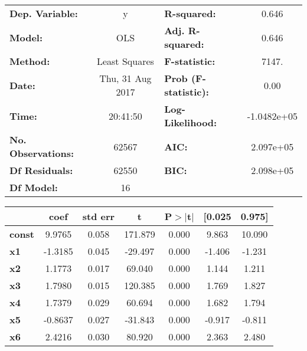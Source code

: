 \documentclass{article}
\begin{document}
\begin{center}
\begin{tabular}{lclc}
\toprule
\textbf{Dep. Variable:}    &        y         & \textbf{  R-squared:         } &      0.646   \\
\textbf{Model:}            &       OLS        & \textbf{  Adj. R-squared:    } &      0.646   \\
\textbf{Method:}           &  Least Squares   & \textbf{  F-statistic:       } &      7147.   \\
\textbf{Date:}             & Thu, 31 Aug 2017 & \textbf{  Prob (F-statistic):} &      0.00    \\
\textbf{Time:}             &     20:41:50     & \textbf{  Log-Likelihood:    } & -1.0482e+05  \\
\textbf{No. Observations:} &       62567      & \textbf{  AIC:               } &  2.097e+05   \\
\textbf{Df Residuals:}     &       62550      & \textbf{  BIC:               } &  2.098e+05   \\
\textbf{Df Model:}         &          16      & \textbf{                     } &              \\
\bottomrule
\end{tabular}
\begin{tabular}{lcccccc}
               & \textbf{coef} & \textbf{std err} & \textbf{t} & \textbf{P$>$$|$t$|$} & \textbf{[0.025} & \textbf{0.975]}  \\
\midrule
\textbf{const} &       9.9765  &        0.058     &   171.879  &         0.000        &        9.863    &       10.090     \\
\textbf{x1}    &      -1.3185  &        0.045     &   -29.497  &         0.000        &       -1.406    &       -1.231     \\
\textbf{x2}    &       1.1773  &        0.017     &    69.040  &         0.000        &        1.144    &        1.211     \\
\textbf{x3}    &       1.7980  &        0.015     &   120.385  &         0.000        &        1.769    &        1.827     \\
\textbf{x4}    &       1.7379  &        0.029     &    60.694  &         0.000        &        1.682    &        1.794     \\
\textbf{x5}    &      -0.8637  &        0.027     &   -31.843  &         0.000        &       -0.917    &       -0.811     \\
\textbf{x6}    &       2.4216  &        0.030     &    80.920  &         0.000        &        2.363    &        2.480     \\

\end{tabular}
\end{center}
\end{document}
